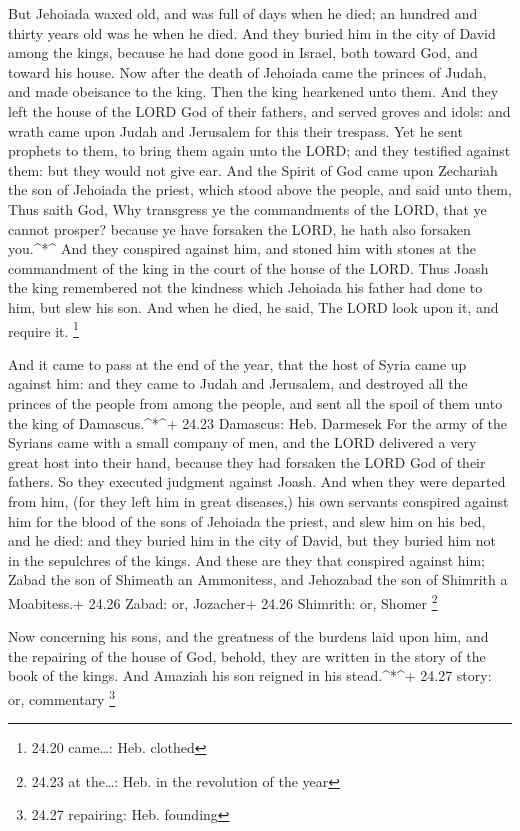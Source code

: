  But Jehoiada waxed old, and was full of days when he died;
an hundred and thirty years old was he when he died.  And
they buried him in the city of David among the kings, because he had
done good in Israel, both toward God, and toward his house.
 Now after the death of Jehoiada came the princes of Judah,
and made obeisance to the king. Then the king hearkened unto them.
 And they left the house of the LORD God of their fathers,
and served groves and idols: and wrath came upon Judah and Jerusalem for
this their trespass.  Yet he sent prophets to them, to
bring them again unto the LORD; and they testified against them: but
they would not give ear.  And the Spirit of God came upon
Zechariah the son of Jehoiada the priest, which stood above the people,
and said unto them, Thus saith God, Why transgress ye the commandments
of the LORD, that ye cannot prosper? because ye have forsaken the LORD,
he hath also forsaken you.\^{}*\^{}  And they conspired
against him, and stoned him with stones at the commandment of the king
in the court of the house of the LORD.  Thus Joash the king
remembered not the kindness which Jehoiada his father had done to him,
but slew his son. And when he died, he said, The LORD look upon it, and
require it. \footnote{24.20 came\ldots: Heb. clothed}

 And it came to pass at the end of the year, that the host
of Syria came up against him: and they came to Judah and Jerusalem, and
destroyed all the princes of the people from among the people, and sent
all the spoil of them unto the king of Damascus.\^{}*\^{}+ 24.23
Damascus: Heb. Darmesek  For the army of the Syrians came
with a small company of men, and the LORD delivered a very great host
into their hand, because they had forsaken the LORD God of their
fathers. So they executed judgment against Joash.  And when
they were departed from him, (for they left him in great diseases,) his
own servants conspired against him for the blood of the sons of Jehoiada
the priest, and slew him on his bed, and he died: and they buried him in
the city of David, but they buried him not in the sepulchres of the
kings.  And these are they that conspired against him;
Zabad the son of Shimeath an Ammonitess, and Jehozabad the son of
Shimrith a Moabitess.+ 24.26 Zabad: or, Jozacher+ 24.26 Shimrith: or,
Shomer \footnote{24.23 at the\ldots: Heb. in the revolution of the year}

 Now concerning his sons, and the greatness of the burdens
laid upon him, and the repairing of the house of God, behold, they are
written in the story of the book of the kings. And Amaziah his son
reigned in his stead.\^{}*\^{}+ 24.27 story: or, commentary \footnote{24.27
  repairing: Heb. founding}

